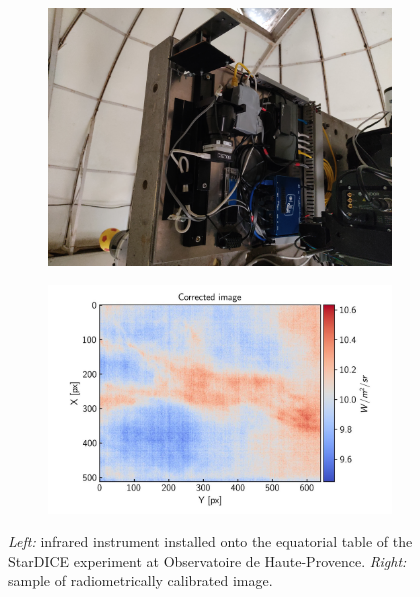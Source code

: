 \documentclass{article}
\begin{document}
\begin{figure}
    \centering
    
    \begin{subfigure}[b]{0.4\textwidth}
        \includegraphics[width=\textwidth]{figures/infrared_instrument.jpg}
        \label{fig:subfig1}
    \end{subfigure}
    \hfill
    \begin{subfigure}[b]{0.5\textwidth}
        \includegraphics[width=\textwidth]{figures/calibrated_sky_image.jpg}
        \label{fig:subfig2}
    \end{subfigure}
    
    \caption{\textit{Left:} infrared instrument installed onto the equatorial table of the StarDICE experiment at Observatoire de Haute-Provence. \textit{Right:} sample of radiometrically calibrated image.}
    \label{fig:side_by_side}
\end{figure}
\end{document}
